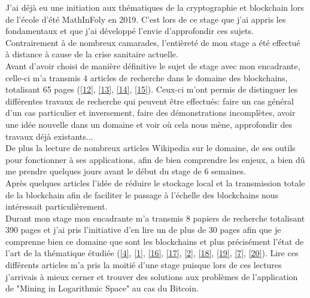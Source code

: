 \documentclass[12pt,a4paper]{article}
\newcommand{\source}[1]{\hyperlink{#1}{[#1]}}
\begin{document}
	J'ai déjà eu une initiation aux thématiques de la cryptographie et blockchain lors de l'école d'été MathInFoly en 2019. C'est lors de ce stage que j'ai appris les fondamentaux et que j'ai développé l'envie d'approfondir ces sujets.\\
	
	Contrairement à de nombreux camarades, l'entièreté de mon stage a été effectué à distance à cause de la crise sanitaire actuelle.\\
	Avant d'avoir choisi de manière définitive le sujet de stage avec mon encadrante, celle-ci m'a transmis 4 articles de recherche dans le domaine des blockchains, totalisant 65 pages (\source{12}, \source{13}, \source{14}, \source{15}). Ceux-ci m'ont permis de distinguer les différentes travaux de recherche qui peuvent être effectués: faire un cas général d'un cas particulier et inversement, faire des démonstrations incomplètes, avoir une idée nouvelle dans un domaine et voir où cela nous mène, approfondir des travaux déjà existants...\\

	De plus la lecture de nombreux articles Wikipedia sur le domaine, de ses outils pour fonctionner à ses applications, afin de bien comprendre les enjeux, a bien dû me prendre quelques jours avant le début du stage de 6 semaines.\\%
	Après quelques articles l'idée de réduire le stockage local et la transmission totale de la blockchain afin de faciliter le passage à l'échelle des blockchains nous intéressait particulièrement.\\
	
	Durant mon stage mon encadrante m'a transmis 8 papiers de recherche totalisant 390 pages et j'ai pris l'initiative d'en lire un de plus de 30 pages afin que je comprenne bien ce domaine que sont les blockchains et plus précisément l'état de l'art de la thématique étudiée (\source{4}, \source{1}, \source{16}, \source{17}, \source{2}, \source{18}, \source{19}, \source{7}, \source{20}). Lire ces différents articles m'a pris la moitié d'une stage puisque lors de ces lectures j'arrivais à mieux cerner et trouver des solutions aux problèmes de l'application de "Mining in Logarithmic Space" au cas du Bitcoin.\\
	
\end{document}
